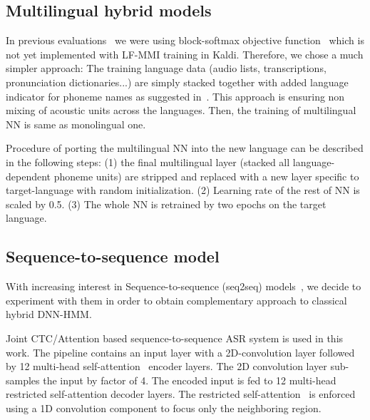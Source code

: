 \documentclass{article}
\begin{document}
\subsection{Multilingual hybrid models}
\label{sec:multAM}

In previous
evaluations~\cite{karafiat:IS:2017:MultBLSTM,karafiat:IS:2018:OpenSAT}
we were using block-softmax objective function~\cite{vesely:slt:2012}
which is not yet implemented with LF-MMI training in Kaldi. Therefore,
we chose a much simpler approach: The training language data (audio lists,
transcriptions, pronunciation dictionaries...)  are simply stacked together with
added language indicator for phoneme names  as suggested
in~\cite{Keith:ICASSP:2018:MultilinualTDNN}. This approach is ensuring
non mixing of acoustic units across the languages. Then, the training
of multilingual NN is same as monolingual one.  

Procedure of porting the multilingual NN into the new language can be
described in the following steps:
(1) the  final multilingual layer (stacked all language-dependent phoneme units)
 are stripped and replaced with a new layer specific to
target-language with random initialization. (2) Learning rate of the rest of NN is scaled
by 0.5. (3) The whole NN is retrained by two epochs on the target language.

\subsection{Sequence-to-sequence model}
With increasing interest in Sequence-to-sequence (seq2seq)
models~\cite{chorowski2015attention,watanabe2017hybrid}, we decide to
experiment with them in order to obtain complementary approach to classical hybrid DNN-HMM.  

Joint CTC/Attention \cite{watanabe2017attctc} based sequence-to-sequence ASR system is used in this
work. The pipeline contains an input layer with a 2D-convolution layer followed by 12 multi-head self-attention~\cite{vaswani2017attention} encoder layers. The 2D convolution layer sub-samples the input by factor of 4. The encoded input is fed to 12 multi-head restricted self-attention decoder layers.  The restricted self-attention~\cite{yang2019convolutional} is enforced using a 1D convolution component to focus only the neighboring region. 
\end{document}
